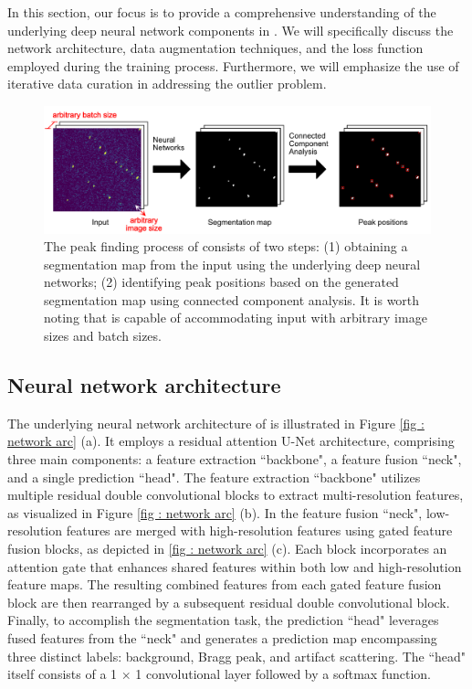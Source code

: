 \documentclass[a4paper]{article}
\begin{document}
In this section, our focus is to provide a comprehensive understanding of the underlying deep neural network components in \peaknet{}.  We will specifically discuss the network architecture, data augmentation techniques, and the loss function employed during the training process.  Furthermore, we will emphasize the use of iterative data curation in addressing the outlier problem.

\begin{figure}[!ht]
\includegraphics[width=\textwidth,keepaspectratio]
{./figures/peaknet_steps.pdf}
\caption{The peak finding process of \peaknet{} consists of two steps: (1)
obtaining a segmentation map from the input using the underlying deep neural
networks; (2) identifying peak positions based on the generated segmentation map
using connected component analysis.  It is worth noting that \peaknet{} is
capable of accommodating input with arbitrary image sizes and batch sizes.  }
\label{fig : peak finding}
\end{figure}


\subsection{Neural network architecture}

The underlying neural network architecture of \peaknet{} is illustrated in Figure \ref{fig : network arc} (a).  It employs a residual attention U-Net architecture, comprising three main components: a feature extraction ``backbone", a feature fusion ``neck", and a single prediction ``head".  The feature extraction ``backbone" utilizes multiple residual double convolutional blocks to extract multi-resolution features, as visualized in Figure \ref{fig : network arc} (b).  In the feature fusion ``neck", low-resolution features are merged with high-resolution features using gated feature fusion blocks, as depicted in \ref{fig : network arc} (c).  Each block incorporates an attention gate that enhances shared features within both low and high-resolution feature maps.  The resulting combined features from each gated feature fusion block are then rearranged by a subsequent residual double convolutional block.  Finally, to accomplish the segmentation task, the prediction ``head" leverages fused features from the ``neck" and generates a prediction map encompassing three distinct labels: background, Bragg peak, and artifact scattering.  The ``head" itself consists of a 1 $\times$ 1 convolutional layer followed by a softmax function.
\end{document}
